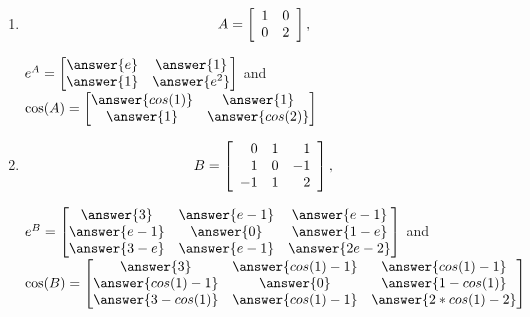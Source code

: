 \documentclass{ximera}
\begin{document}
\begin{problem}
  
  \begin{enumerate}
    \item $$A = \startmat{rr}
      1 & 0 \\
      0 & 2 \\
    \stopmat,$$
    
    $e^A=\begin{bmatrix}
      \answer{e} & \answer{1}\\
      \answer{1} & \answer{e^2}
    \end{bmatrix}$ and $\cos(A)=\begin{bmatrix}
      \answer{cos(1)} & \answer{1}\\
      \answer{1} & \answer{cos(2)}
    \end{bmatrix}$


    \item $$B = \startmat{rrr}
      0 & 1 & 1 \\
      1 & 0 & -1 \\
      -1 & 1 & 2 \\
    \stopmat,$$

    $e^B=\begin{bmatrix}
      \answer{3}&\answer{e-1}&\answer{e-1}\\
      \answer{e-1}& \answer{0} & \answer{1-e}\\
      \answer{3-e}& \answer{e-1} & \answer{2e-2}
    \end{bmatrix}$ and $\cos(B)=\begin{bmatrix}
      \answer{3}&\answer{cos(1)-1}&\answer{cos(1)-1}\\
      \answer{cos(1)-1}& \answer{0} & \answer{1-cos(1)}\\
      \answer{3-cos(1)}& \answer{cos(1)-1} & \answer{2*cos(1)-2}
    \end{bmatrix}$


  \end{enumerate}

  
\end{problem}
\end{document}
